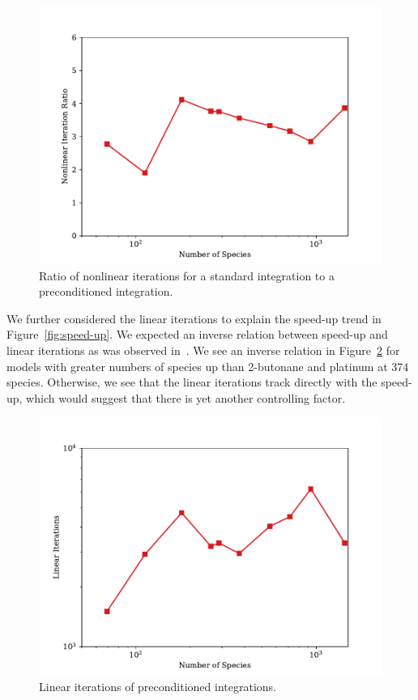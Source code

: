 \documentclass[12pt]{ussci}
\begin{document}
\begin{figure}[htbp]
    \centering
    \includegraphics[scale=0.65]{figures/nonlinear_itrs.pdf}
    \caption{Ratio of nonlinear iterations for a standard integration to a preconditioned integration.}
    \label{fig:non-ratio}
\end{figure}

We further considered the linear iterations to explain the speed-up trend in Figure~\ref{fig:speed-up}. 
We expected an inverse relation between speed-up and linear iterations as was observed in~\cite{walker2022generalized}.
We see an inverse relation in Figure~\ref{fig:lin-iters} for models with greater numbers of species up than 2-butonane and platinum at 374 species. 
Otherwise, we see that the linear iterations track directly with the speed-up, which would suggest that there is yet another controlling factor.

\begin{figure}[htbp]
    \centering
    \includegraphics[scale=0.65]{figures/linear_itrs.pdf}
    \caption{Linear iterations of preconditioned integrations.}
    \label{fig:lin-iters}
\end{figure}
\end{document}

